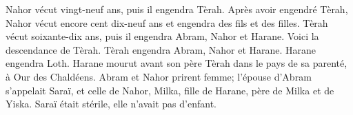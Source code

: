 Nahor vécut vingt-neuf ans, puis il engendra Tèrah.
Après avoir engendré Tèrah, Nahor vécut encore cent dix-neuf ans
	et engendra des fils et des filles.
Tèrah vécut soixante-dix ans, puis il engendra Abram, Nahor et Harane.
Voici la descendance de Tèrah.
	Tèrah engendra Abram, Nahor et Harane. Harane engendra Loth.
Harane mourut avant son père Tèrah
	dans le pays de sa parenté, à Our des Chaldéens.
Abram et Nahor prirent femme; l’épouse d’Abram s’appelait Saraï,
	et celle de Nahor, Milka, fille de Harane, père de Milka et de Yiska.
Saraï était stérile, elle n’avait pas d’enfant.
